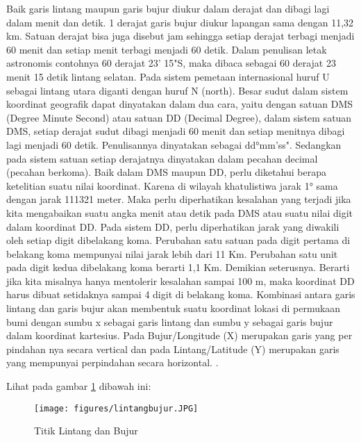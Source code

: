 Baik garis lintang maupun garis bujur diukur dalam derajat dan dibagi lagi dalam menit dan detik. 1 derajat garis bujur diukur lapangan sama dengan 11,32 km. Satuan derajat bisa juga disebut jam sehingga setiap derajat terbagi menjadi 60 menit dan setiap menit terbagi menjadi 60 detik. Dalam penulisan letak astronomis contohnya 60 derajat 23' 15"S, maka dibaca sebagai 60 derajat 23 menit 15 detik lintang selatan. Pada sistem pemetaan internasional huruf U sebagai lintang utara diganti dengan huruf N (north). Besar sudut dalam sistem koordinat geografik dapat dinyatakan dalam dua cara, yaitu dengan satuan DMS (Degree Minute Second) atau satuan DD (Decimal Degree), dalam sistem satuan DMS, setiap derajat sudut dibagi menjadi 60 menit dan setiap menitnya dibagi lagi menjadi 60 detik. Penulisannya dinyatakan sebagai dd°mm'ss". Sedangkan pada sistem satuan setiap derajatnya dinyatakan dalam pecahan decimal (pecahan berkoma). Baik dalam DMS maupun DD, perlu diketahui berapa ketelitian suatu nilai koordinat. Karena di wilayah khatulistiwa jarak 1° sama dengan jarak 111321 meter. Maka perlu diperhatikan kesalahan yang terjadi jika kita mengabaikan suatu angka menit atau detik pada DMS atau suatu nilai digit dalam koordinat DD. Pada sistem DD, perlu diperhatikan jarak yang diwakili oleh setiap digit dibelakang koma. Perubahan satu satuan pada digit pertama di belakang koma mempunyai nilai jarak lebih dari 11 Km. Perubahan satu unit pada digit kedua dibelakang koma berarti 1,1 Km. Demikian seterusnya. Berarti jika kita misalnya hanya mentolerir kesalahan sampai 100 m, maka koordinat DD harus dibuat setidaknya sampai 4 digit di belakang koma. Kombinasi antara garis lintang dan garis bujur akan membentuk suatu koordinat lokasi di permukaan bumi dengan sumbu x sebagai garis lintang dan sumbu y sebagai garis bujur dalam koordinat kartesius. Pada Bujur/Longitude (X) merupakan garis yang per pindahan nya secara vertical dan pada Lintang/Latitude (Y) merupakan garis yang mempunyai perpindahan secara horizontal. \cite{zuhdi2012sistem}.

Lihat pada gambar \ref{lintang bujur} dibawah ini:
\begin{figure}[ht]
	\centerline{\texttt{[image: figures/lintangbujur.JPG]}}
	\caption{Titik Lintang dan Bujur}
	\label{lintang bujur}
	\end{figure}

